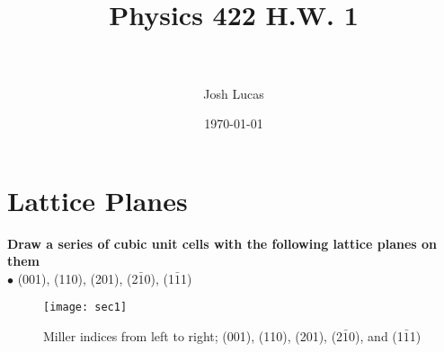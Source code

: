 \documentclass[paper=a4, fontsize=11pt]{scrartcl} %
\title{	
\normalfont \normalsize  %
\horrule{0.5pt} \\[0.4cm] %
\huge Physics 422 H.W. 1\\ %
\horrule{2pt} \\[0.5cm] %
}
\author{Josh Lucas} %
\date{\normalsize\today} %
\numberwithin{equation}{section} %
\numberwithin{figure}{section} %
\numberwithin{table}{section} %
\begin{document}
\maketitle %


\section{Lattice Planes}
\textbf{Draw a series of cubic unit cells with the following lattice planes on them}\\
$\bullet$ (001), (110), (201), (2$\bar{1}$0), (1$\bar{1}$1)
\begin{figure}[!h]
\texttt{[image: sec1]}
\caption{Miller indices from left to right; (001), (110), (201), (2$\bar{1}$0), and (1$\bar{1}$1) }
\end{figure}
%









\end{document}
